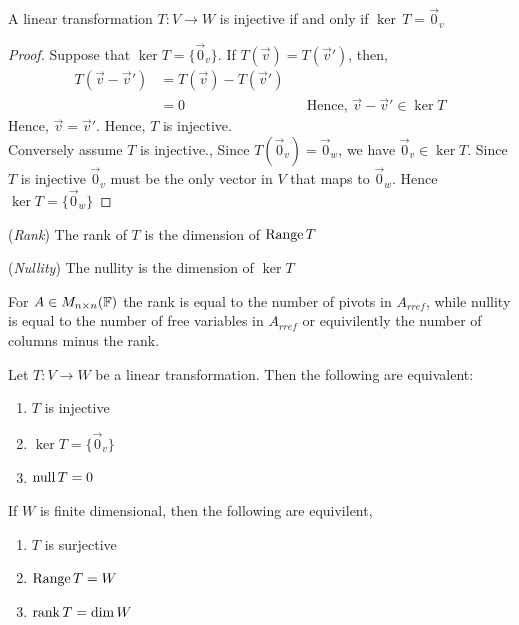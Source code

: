 \documentclass{article}
\begin{document}
\begin{nlemma}
  A linear transformation $T : V \to W$ is injective if and only if $\ker\, T = \vec 0_v$
\end{nlemma}

\begin{proof}
  Suppose that $\ker T = \{\vec 0_v\}$. If $T(\vec v) = T(\vec v')$, then,
  \begin{align*}
    T(\vec v - \vec v') &= T(\vec v) - T(\vec v')\\
    &= 0 && \text{Hence, $\vec v - \vec v' \in \ker T$}
  \end{align*}
  Hence, $\vec v = \vec v'$. Hence, $T$ is injective.\\
  Conversely assume $T$ is injective., Since $T(\vec 0_v) = \vec 0_w$, we have $\vec 0_v \in \ker T$. Since $T$ is injective $\vec 0_v$ must be the only vector in $V$ that maps to $\vec 0_w$. Hence $\ker T = \{\vec 0_w\}$
\end{proof}

\begin{ndefi}{(\textit{Rank})}
  The rank of $T$ is the dimension of $\operatorname{Range} T$
\end{ndefi}

\begin{ndefi}{(\textit{Nullity})}
  The nullity is the dimension of $\ker T$
\end{ndefi}

\begin{remark}
  For $A\in M_{n\times n}(\mathbb{F})$ the rank is equal to the number of pivots in $A_{rref}$, while nullity is equal to the number of free variables in $A_{rref}$ or equivilently the number of columns minus the rank.
\end{remark}

\begin{ncor}
  Let $T : V \to W$ be a linear transformation. Then the following are equivalent:
  \begin{enumerate}
    \item $T$ is injective
    \item $\ker T = \{\vec 0_v\}$
    \item $\operatorname{null} T = 0$
  \end{enumerate}
  If $W$ is finite dimensional, then the following are equivilent,
  \begin{enumerate}
    \item $T$ is surjective
    \item $\operatorname{Range} T = W$
    \item $\operatorname{rank} T = \dim W$
  \end{enumerate}
\end{ncor}
\end{document}
